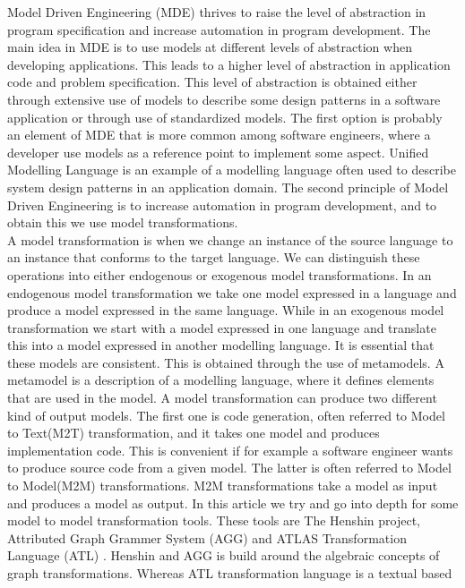 \documentclass[pdftex,11pt,a4paper]{article}
\begin{document}
\noindent Model Driven Engineering (MDE)\cite{France2007} thrives to raise the
level of abstraction in program specification and increase automation in program
development. The main idea in MDE is to use models at different levels of
abstraction when developing applications. This leads to a higher level
of abstraction in application code and problem specification. This level of
abstraction is obtained either through extensive use of models to describe some
design patterns in a software application or through use of standardized
models. The first option is probably an element of MDE that is more common
among software engineers, where a developer use models as a reference point to 
implement some aspect. Unified Modelling Language\cite{UML} is an example of a
modelling language often used to describe system design patterns in an application
domain. The second principle of Model Driven Engineering is to increase
automation in program development, and to obtain this we use model
transformations. \\
\indent A model transformation is when we change an instance of the source
language to an instance that conforms to the target language. We can
distinguish these operations into either endogenous or exogenous model
transformations. In an endogenous model transformation we take one model
expressed in a language and produce a model expressed in the same language.
While in an exogenous model transformation we start with a model
expressed in one language and translate this into a model expressed in another
modelling language. It is essential that these models are consistent. This is
obtained through the use of metamodels. A metamodel is a description of a
modelling language, where it defines elements that are used in the model.
A model transformation can produce two different kind of output models. The
first one is code generation, often referred to Model to Text(M2T)
transformation, and it takes one model and produces implementation code. This
is convenient if for example a software engineer wants to produce source code
from a given model. 
The latter is often referred to Model to Model(M2M) transformations. M2M
transformations take a model as input and produces a model as output. In this
article we try and go into depth for some model to model transformation tools.
These tools are The Henshin project\cite{Henshin}, Attributed Graph Grammer
System (AGG) \cite{AGG} and ATLAS Transformation Language (ATL) \cite{ATL}.
Henshin and AGG is build around the algebraic concepts of graph
transformations. Whereas ATL transformation language is a textual based
\end{document}
